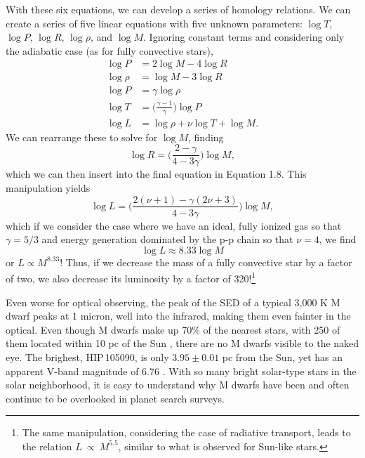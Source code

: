 \documentclass[12pt]{caltech_thesis}
\begin{document}
With these six equations, we can develop a series of homology relations. We can create
a series of five linear equations with five unknown parameters: $\log T$, $\log P$, 
$\log R$, $\log \rho$, and $\log M$.
Ignoring constant terms and considering only the adiabatic case (as for fully 
convective stars),
\begin{align}
\log P &= 2 \log M - 4 \log R \nonumber \\
\log \rho &= \log M - 3 \log R \nonumber \\
\log P &= \gamma \log \rho \\
\log T &= \bigg(\frac{\gamma - 1}{\gamma}\bigg) \log P \nonumber \\
\log L &= \log \rho + \nu \log T + \log M \nonumber.
\end{align}
We can rearrange these to solve for $\log M$, finding
\begin{equation}
\log R = \bigg(\frac{2-\gamma}{4 - 3\gamma}\bigg) \log M,
\end{equation}
which we can then insert into the final equation in Equation 1.8.
This manipulation yields
\begin{equation}
\log L = \bigg(\frac{2(\nu + 1) - \gamma(2\nu + 3)}{4 - 3\gamma}\bigg) \log M,
\end{equation}
which if we consider the case where we have an ideal, fully ionized gas so that $\gamma = 5/3$ and energy generation dominated by the p-p chain so that $\nu = 4$, we find
\begin{equation}
\log L \approx 8.33 \log M
\end{equation}
or $L \propto M^{8.33}$! Thus, if we decrease the mass of a fully convective star by a factor of two, 
we also decrease its luminosity by a factor of 320!\footnote{The same manipulation,
considering the case of radiative transport, leads to the relation $L~\propto~M^{5.5}$,
similar to what is observed for Sun-like stars.} 

Even worse for optical observing,
the peak of the SED of a typical 3,000 K M dwarf peaks at 1 micron, well into the infrared, making them even fainter in the optical.
Even though M dwarfs make up 70\% of the nearest stars, with 250 of them located within
10 pc of the Sun \citep[e.g.][]{Henry06}, there are no M dwarfs visible to the naked 
eye.
The brighest, HIP\,105090, is only $3.95 \pm 0.01$ pc from the Sun, yet has an apparent V-band magnitude of 6.76 \citep{vanLeeuwen07}.
With so many bright solar-type stars in the solar neighborhood, it is easy to understand why M dwarfs have been and often continue to be overlooked in planet search
surveys. 
\end{document}
